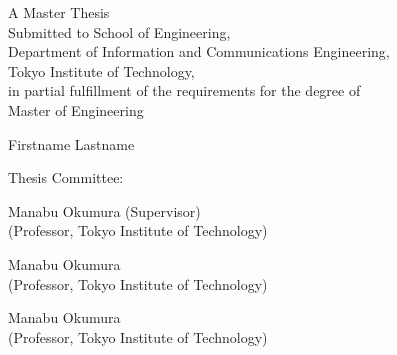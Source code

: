 \newenvironment{xlist}{%
  \begin{list}{}{%
    \setlength{\labelwidth}{0em}
    \setlength{\labelsep}{0em}
    \setlength{\leftmargin}{\labelwidth}
    \addtolength{\leftmargin}{\labelsep}
    \setlength{\rightmargin}{0pt}
    \setlength{\parsep}{0ex plus 0.2ex minus 0.1ex}
    \setlength{\itemsep}{0.1ex plus 0.2ex}
  }
}
{\end{list}}
\thispagestyle{empty}
    \begin{center}
        \vspace*{6cm}
        A Master Thesis\\
        Submitted to School of Engineering,\\
        Department of Information and Communications Engineering,\\
        Tokyo Institute of Technology,\\
        in partial fulfillment of the requirements for the degree of\\
        Master of Engineering

        \vspace{1cm}
        Firstname Lastname
   \end{center}

\vspace{1cm}
\begin{flushleft}
    Thesis Committee:
    \begin{xlist}
        \item Manabu Okumura (Supervisor)\\(Professor, Tokyo Institute of Technology)
        \item Manabu Okumura\\(Professor, Tokyo Institute of Technology)
        \item Manabu Okumura\\(Professor, Tokyo Institute of Technology)
    \end{xlist}
\end{flushleft}

\restoregeometry